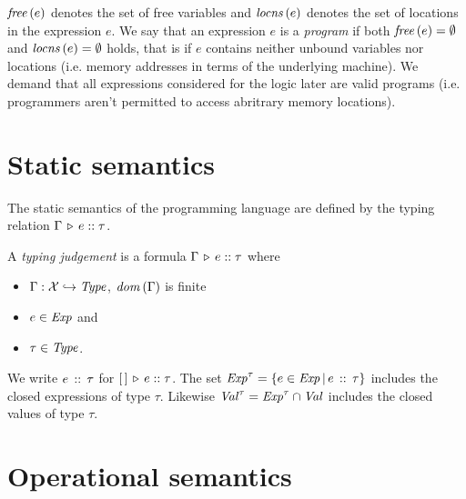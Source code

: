 \documentclass[12pt,a4paper]{report}
\begin{document}
$\mathit{free}\,(e)$ denotes the set of free variables and $\mathit{locns}\,(e)$ denotes the set of locations in the
expression $e$. We say that an expression $e$ is a {\em program} if both $\mathit{free}\,(e)=\emptyset$
and $\mathit{locns}\,(e)=\emptyset$ holds, that is if $e$ contains neither unbound variables nor
locations (i.e. memory addresses in terms of the underlying machine). We demand that all expressions
considered for the logic later are valid programs (i.e. programmers aren't permitted to access
abritrary memory locations).



\section{Static semantics}

The static semantics of the programming language are defined by the typing relation
$\Gamma\,\triangleright\,e\mathrel{::}\tau$.

\begin{definition}
  A {\em typing judgement} is a formula $\Gamma\,\triangleright\,e\mathrel{::}\tau$ where
  \begin{itemize}
    \item $\Gamma:\mathcal{X} \hookrightarrow \mathit{Type}$, $\mathit{dom}\,(\Gamma)$ is finite
    \item $e\in\mathit{Exp}$ and
    \item $\tau\in\mathit{Type}$.
  \end{itemize}
\end{definition}

We write $e\,\mathrel{::}\,\tau$ for $[\,]\,\triangleright\,e\mathrel{::}\tau$. The set $\mathit{Exp}^\tau = \{e\in\mathit{Exp}\,|\,e\,\mathrel{::}\,\tau\}$
includes the closed expressions of type $\tau$. Likewise $\mathit{Val}^\tau = \mathit{Exp}^\tau \cap \mathit{Val}$ includes
the closed values of type $\tau$.



\section{Operational semantics}
\end{document}
